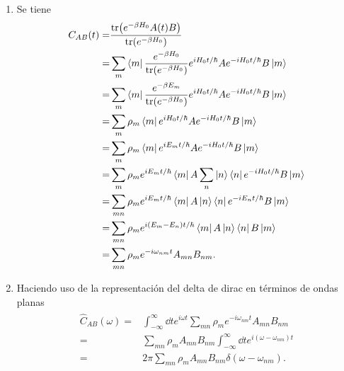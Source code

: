 \documentclass{article}
\begin{document}
\begin{enumerate}
\end{enumerate}

\begin{enumerate}

\item Se tiene
\begin{align}
\begin{split}
C_{AB}(t)=&\frac{\tr(e^{-\beta H_0}A(t)B)}{\tr(e^{-\beta H_0})}\\
=&\sum_m\bra{m}\frac{e^{-\beta H_0}}{\tr(e^{-\beta H_0})}e^{iH_0t/\hbar}Ae^{-iH_0t/\hbar}B\ket{m}\\
=&\sum_m\bra{m}\frac{e^{-\beta E_m}}{\tr(e^{-\beta H_0})}e^{iH_0t/\hbar}Ae^{-iH_0t/\hbar}B\ket{m}\\
=&\sum_m\rho_m\bra{m}e^{iH_0t/\hbar}Ae^{-iH_0t/\hbar}B\ket{m}\\
=&\sum_m\rho_m\bra{m}e^{iE_mt/\hbar}Ae^{-iH_0t/\hbar}B\ket{m}\\
=&\sum_m\rho_me^{iE_mt/\hbar}\bra{m}A\sum_n\ket{n}\bra{n}e^{-iH_0t/\hbar}B\ket{m}\\
=&\sum_{mn}\rho_me^{iE_mt/\hbar}\bra{m}A\ket{n}\bra{n}e^{-iE_nt/\hbar}B\ket{m}\\
=&\sum_{mn}\rho_me^{i(E_m-E_n)t/\hbar}\bra{m}A\ket{n}\bra{n}B\ket{m}\\
=&\sum_{mn}\rho_me^{-i\omega_{nm}t}A_{mn}B_{nm}.
\end{split}
\end{align}

\item Haciendo uso de la representación del delta de dirac en términos de ondas planas
\begin{align}
\begin{split}
\hat{C}_{AB}(\omega)=&\int_{-\infty}^\infty\dd{t}e^{i\omega t}\sum_{mn}\rho_me^{-i\omega_{nm}t}A_{mn}B_{nm}\\
=&\sum_{mn}\rho_mA_{mn}B_{nm}\int_{-\infty}^\infty\dd{t}e^{i(\omega-\omega_{nm})t}\\
=&2\pi\sum_{mn}\rho_mA_{mn}B_{nm}\delta(\omega-\omega_{nm}).
\end{split}
\end{align}


\end{enumerate}
\end{document}
